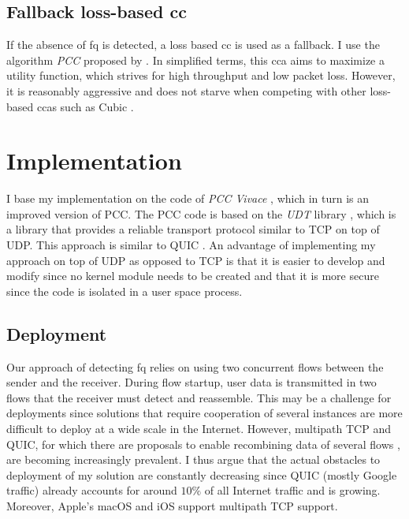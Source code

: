 \documentclass[conference]{IEEEtran}
\begin{document}
\subsection{Fallback loss-based \gls{cc}}

If the absence of \gls{fq} is detected, a loss based \gls{cc} is used as a fallback. I use the algorithm \textit{PCC} proposed by \citep{dong_pcc_2015}. In simplified terms, this \gls{cca} aims to maximize a utility function, which strives for high throughput and low packet loss. However, it is reasonably aggressive and does not starve when competing with other loss-based \glspl{cca} such as Cubic \citep{ha_cubic_2008}.

\section{Implementation}

I base my implementation on the code of \textit{PCC Vivace} \citep{dong_pcc_2018}, which in turn is an improved version of PCC. The PCC code is based on the \textit{UDT} library \citep{gu_udt_2007}, which is a library that provides a reliable transport protocol similar to TCP on top of UDP. This approach is similar to QUIC \citep{iyengar_quic_2018}. An advantage of implementing my approach on top of UDP as opposed to TCP is that it is easier to develop and modify since no kernel module needs to be created and that it is more secure since the code is isolated in a user space process. 

\subsection{Deployment}

Our approach of detecting \gls{fq} relies on using two concurrent flows between the sender and the receiver. During flow startup, user data is transmitted in two flows that the receiver must detect and reassemble. This may be a challenge for deployments since solutions that require cooperation of several instances are more difficult to deploy at a wide scale in the Internet. 
However, multipath TCP \citep{handley_tcp_2012} and QUIC, for which there are proposals to enable recombining data of several flows \citep{de_coninck_multipath_2017}, are becoming increasingly prevalent. I thus argue that the actual obstacles to deployment of my solution are constantly decreasing since QUIC (mostly Google traffic) already accounts for around 
$10\%$ of all Internet traffic \citep{ruth_first_2018} and is growing. Moreover, Apple's macOS and iOS support multipath TCP \citep{apple_about_2018} support. 
\end{document}
